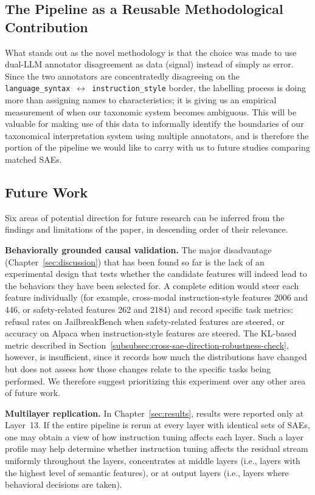 \subsection{The Pipeline as a Reusable Methodological Contribution}
\label{subsec:pipeline-as-methodological-contribution}

What stands out as the novel methodology is that the choice was made to use dual-LLM annotator disagreement as data (signal) instead of simply as error. Since the two annotators are concentratedly disagreeing on the \texttt{language\_syntax}~$\leftrightarrow$~\texttt{instruction\_style} border, the labelling process is doing more than assigning names to characteristics; it is giving us an empirical measurement of when our taxonomic system becomes ambiguous. This will be valuable for making use of this data to informally identify the boundaries of our taxonomical interpretation system using multiple annotators, and is therefore the portion of the pipeline we would like to carry with us to future studies comparing matched SAEs.

\subsection{Future Work}
\label{subsec:future-work-directions}
\label{sec:future-work}

Six areas of potential direction for future research can be inferred from the findings and limitations of the paper, in descending order of their relevance.

\textbf{Behaviorally grounded causal validation.} The major disadvantage (Chapter~\ref{sec:discussion}) that has been found so far is the lack of an experimental design that tests whether the candidate features will indeed lead to the behaviors they have been selected for. A complete edition would steer each feature individually (for example, cross-modal instruction-style features 2006 and 446, or safety-related features 262 and 2184) and record specific task metrics: refusal rates on JailbreakBench when safety-related features are steered, or accuracy on Alpaca when instruction-style features are steered. The KL-based metric described in Section~\ref{subsubsec:cross-sae-direction-robustness-check}, however, is insufficient, since it records how much the distributions have changed but does not assess how those changes relate to the specific tasks being performed. We therefore suggest prioritizing this experiment over any other area of future work.

\textbf{Multilayer replication.} In Chapter~\ref{sec:results}, results were reported only at Layer~13. If the entire pipeline is rerun at every layer with identical sets of SAEs, one may obtain a view of how instruction tuning affects each layer. Such a layer profile may help determine whether instruction tuning affects the residual stream uniformly throughout the layers, concentrates at middle layers (i.e., layers with the highest level of semantic features), or at output layers (i.e., layers where behavioral decisions are taken).

